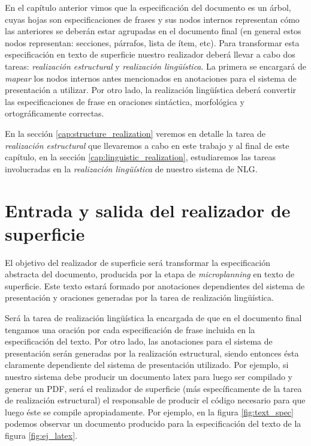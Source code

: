En el capítulo anterior vimos que la especificación del documento es un árbol, cuyas hojas son especificaciones de frases y sus nodos internos representan cómo las anteriores se deberán estar agrupadas en el documento final (en general estos nodos representan: secciones, párrafos, lista de ítem, etc). Para transformar esta especificación en texto de superficie nuestro realizador deberá llevar a cabo dos tareas: \emph{realización estructural} y \emph{realización lingüística}. La primera se encargará de \emph{mapear} los nodos internos antes mencionados en anotaciones para el sistema de presentación a utilizar. Por otro lado, la realización lingüística deberá convertir las especificaciones de frase en oraciones sintáctica, morfológica y ortográficamente correctas.

En la sección \ref{cap:structure_realization} veremos en detalle la tarea de \emph{realización estructural} que llevaremos a cabo en este trabajo y al final de este capítulo, en la sección \ref{cap:linguistic_realization}, estudiaremos las tareas involucradas en la \emph{realización lingüística} de nuestro sistema de NLG.

\section{Entrada y salida del realizador de superficie}

El objetivo del realizador de superficie será transformar la especificación abstracta del documento, producida por la etapa de \textit{microplanning} en texto de superficie. Este texto estará formado por anotaciones dependientes del sistema de presentación y oraciones generadas por la tarea de realización lingüística.

Será la tarea de realización lingüística la encargada de que en el documento final tengamos una oración por cada especificación de frase incluida en la especificación del texto. Por otro lado, las anotaciones para el sistema de presentación serán generadas por la realización estructural, siendo entonces ésta claramente dependiente del sistema de presentación utilizado. Por ejemplo, si nuestro sistema debe producir un documento latex para luego ser compilado y generar un PDF, será el realizador de superficie (más específicamente de la tarea de realización estructural) el responsable de producir el código necesario para que luego éste se compile apropiadamente. Por ejemplo, en la figura \ref{fig:text_spec} podemos observar un documento producido para la especificación del texto de la figura \ref{fig:ej_latex}.


